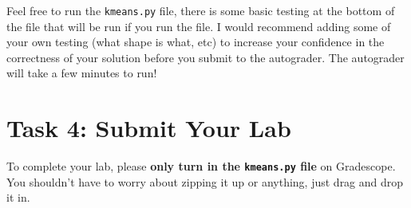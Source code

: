 \documentclass[11pt]{article}
\newcommand{\task}[1]{\section*{\normalsize #1}}
\begin{document}
\noindent Feel free to run the \texttt{kmeans.py} file, there is some basic testing at the bottom of the file that will be run if you run the file.
I would recommend adding some of your own testing (what shape is what, etc) to increase your confidence in the correctness of your solution before you submit to the autograder.
The autograder will take a few minutes to run!


\task{Task 4: Submit Your Lab}
To complete your lab, please \textbf{only turn in the \texttt{kmeans.py} file} on Gradescope. You shouldn't have to worry about zipping it up or anything, just drag and drop it in.
\end{document}
